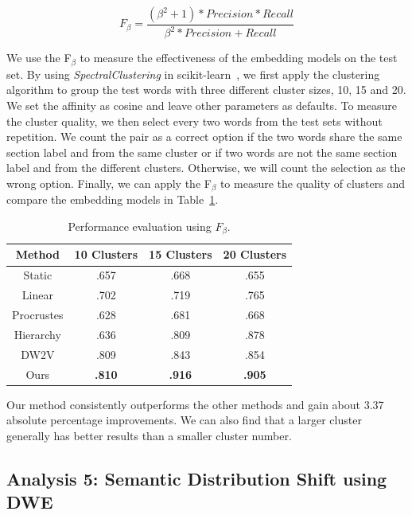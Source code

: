 $$F_\beta = \frac{(\beta^2 + 1) * Precision * Recall}{\beta^2*Precision + Recall}$$

We use the F$_\beta$ to measure the effectiveness of the embedding models on the test set.
By using \textit{SpectralClustering} in scikit-learn~\cite{pedregosa2011scikit}, we first apply the clustering algorithm to group the test words with three different cluster sizes, 10, 15 and 20. 
We set the affinity as cosine and leave other parameters as defaults.
To measure the cluster quality, we then select every two words from the test sets without repetition.
We count the pair as a correct option if the two words share the same section label and from the same cluster or if two words are not the same section label and from the different clusters.
Otherwise, we will count the selection as the wrong option.
Finally, we can apply the F$_\beta$ to measure the quality of clusters and compare the embedding models in Table~\ref{chap3:tab:dweEval}.

\begin{table}[htp]
\centering
\begin{tabular}{c||ccc}
Method & 10 Clusters & 15 Clusters & 20 Clusters \\\hline\hline
Static & .657 & .668 & .655 \\
Linear & .702 & .719 & .765 \\
Procrustes & .628 & .681 & .668 \\
Hierarchy & .636 & .809 & .878 \\
DW2V & .809 & .843 & .854 \\
Ours & \textbf{.810} & \textbf{.916} & \textbf{.905}
\end{tabular}
\caption{Performance evaluation using $F_\beta$.}
\label{chap3:tab:dweEval}
\end{table}

Our method consistently outperforms the other methods and gain about 3.37 absolute percentage improvements. We can also find that a larger cluster generally has better results than a smaller cluster number.


\subsection{Analysis 5: Semantic Distribution Shift using DWE}

